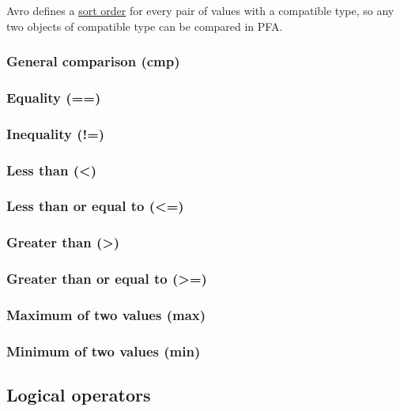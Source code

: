 \documentclass{article}
\theoremstyle{definition}
\begin{document}
Avro defines a \href{http://avro.apache.org/docs/1.7.6/spec.html#order}{sort order} for every pair of values with a compatible type, so any two objects of compatible type can be compared in PFA.

\subsubsection{General comparison (cmp)}

\subsubsection{Equality (==)}
\libfcn{==}

\subsubsection{Inequality (!=)}
\libfcn{!=}

\subsubsection{Less than (<)}
\libfcn{<}

\subsubsection{Less than or equal to (<=)}
\libfcn{<=}

\subsubsection{Greater than (>)}
\libfcn{>}

\subsubsection{Greater than or equal to (>=)}
\libfcn{>=}

\subsubsection{Maximum of two values (max)}

\subsubsection{Minimum of two values (min)}

\subsection{Logical operators}
\end{document}
